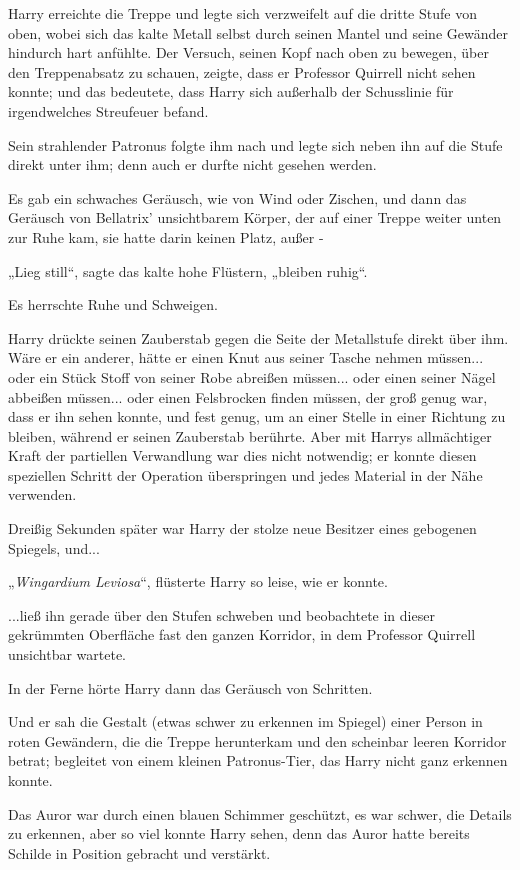 {Harry erreichte die Treppe und legte sich verzweifelt auf die dritte Stufe von oben, wobei sich das kalte Metall selbst durch seinen Mantel und seine Gewänder hindurch hart anfühlte. Der Versuch, seinen Kopf nach oben zu bewegen, über den Treppenabsatz zu schauen, zeigte, dass er Professor Quirrell nicht sehen konnte; und das bedeutete, dass Harry sich außerhalb der Schusslinie für irgendwelches Streufeuer befand.

Sein strahlender Patronus folgte ihm nach und legte sich neben ihn auf die Stufe direkt unter ihm; denn auch er durfte nicht gesehen werden.

Es gab ein schwaches Geräusch, wie von Wind oder Zischen, und dann das Geräusch von Bellatrix' unsichtbarem Körper, der auf einer Treppe weiter unten zur Ruhe kam, sie hatte darin keinen Platz, außer -

„Lieg still“, sagte das kalte hohe Flüstern, „bleiben ruhig“.

Es herrschte Ruhe und Schweigen.

Harry drückte seinen Zauberstab gegen die Seite der Metallstufe direkt über ihm. Wäre er ein anderer, hätte er einen Knut aus seiner Tasche nehmen müssen... oder ein Stück Stoff von seiner Robe abreißen müssen... oder einen seiner Nägel abbeißen müssen... oder einen Felsbrocken finden müssen, der groß genug war, dass er ihn sehen konnte, und fest genug, um an einer Stelle in einer Richtung zu bleiben, während er seinen Zauberstab berührte. Aber mit Harrys allmächtiger Kraft der partiellen Verwandlung war dies nicht notwendig; er konnte diesen speziellen Schritt der Operation überspringen und jedes Material in der Nähe verwenden.

Dreißig Sekunden später war Harry der stolze neue Besitzer eines gebogenen Spiegels, und...

„\emph{Wingardium Leviosa}“, flüsterte Harry so leise, wie er konnte.

...ließ ihn gerade über den Stufen schweben und beobachtete in dieser gekrümmten Oberfläche fast den ganzen Korridor, in dem Professor Quirrell unsichtbar wartete.

In der Ferne hörte Harry dann das Geräusch von Schritten.

Und er sah die Gestalt (etwas schwer zu erkennen im Spiegel) einer Person in roten Gewändern, die die Treppe herunterkam und den scheinbar leeren Korridor betrat; begleitet von einem kleinen Patronus-Tier, das Harry nicht ganz erkennen konnte.

Das Auror war durch einen blauen Schimmer geschützt, es war schwer, die Details zu erkennen, aber so viel konnte Harry sehen, denn das Auror hatte bereits Schilde in Position gebracht und verstärkt.

}
